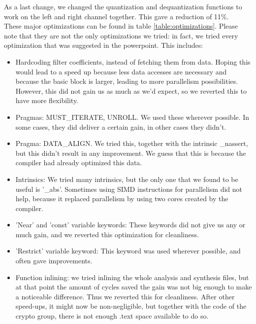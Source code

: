 \documentclass[a4paper]{article}
\begin{document}
As a last change, we changed the quantization and dequantization functions to work on the left and right channel together. This gave a reduction of 11\%.\\
These major optimizations can be found in table \ref{table:optimizations}. Please note that they are not the only optimizations we tried: in fact, we tried every optimization that was suggested in the powerpoint. This includes:
\begin{itemize}
\item Hardcoding filter coefficients, instead of fetching them from data. Hoping this would lead to a speed up because less data accesses are necessary and because the basic block is larger, leading to more parallelism possibilities. However, this did not gain us as much as we'd expect, so we reverted this to have more flexibility.
\item Pragmas: MUST\_ITERATE, UNROLL. We used these wherever possible. In some cases, they did deliver a certain gain, in other cases they didn't.
\item Pragma: DATA\_ALIGN. We tried this, together with the intrinsic \_nassert, but this didn't result in any improvement. We guess that this is because the compiler had already optimized this data.
\item Intrinsics: We tried many intrinsics, but the only one that we found to be useful is '\_abs'. Sometimes using SIMD instructions for parallelism did not help, because it replaced parallelism by using two cores created by the compiler.
\item 'Near' and 'const' variable keywords: These keywords did not give us any or much gain, and we reverted this optimization for cleanliness.
\item 'Restrict' variable keyword: This keyword was used wherever possible, and often gave improvements.
\item Function inlining: we tried inlining the whole analysis and synthesis files, but at that point the amount of cycles saved the gain was not big enough to make a noticeable difference. Thus we reverted this for cleanliness. After other speed-ups, it might now be non-negligible, but together with the code of the crypto group, there is not enough .text space available to do so.
\end{itemize}
\end{document}

